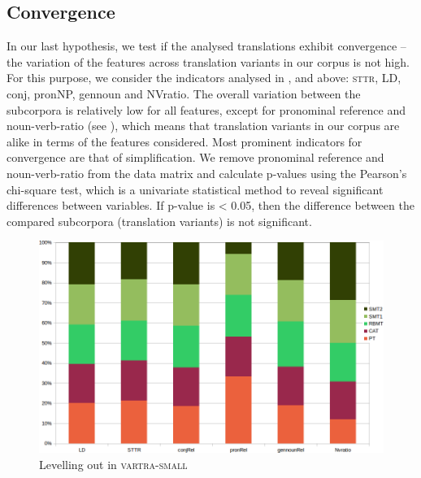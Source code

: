 \documentclass[output=paper]{LSP/langsci}
\begin{document}
\subsection{Convergence}

In our last hypothesis, we test if the analysed translations exhibit convergence – the variation of the features across translation variants in our corpus is not high. For this purpose, we consider the indicators analysed in ,  and  above: \textsc{sttr}, LD, conj, pronNP, gennoun and NVratio. The overall variation between the subcorpora is relatively low for all features, except for pronominal reference and noun-verb-ratio (see ), which means that translation variants in our corpus are alike in terms of the features considered.  Most prominent indicators for convergence are that of simplification.  We remove pronominal reference and noun-verb-ratio from the data matrix and calculate p-values using the Pearson’s chi-square test, which is a univariate statistical method to reveal significant differences between variables. If p-value is < 0.05, then the difference between the compared subcorpora (translation variants) is not significant.

\begin{figure}
\includegraphics[width=1.0\textwidth]{./figures/5-1.png}
\caption{Levelling out in \textsc{vartra}-\textsc{small}} \label{fig:4:1}
\end{figure} 
\end{document}
